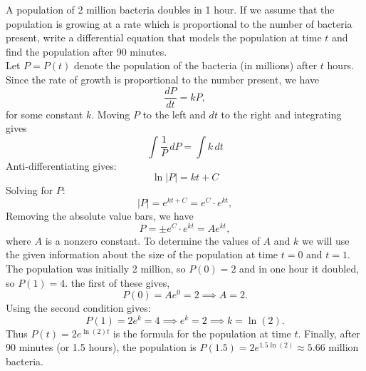 \documentclass[handout]{ximera}
\begin{document}
\begin{example}[example 5]
A population of 2 million bacteria doubles in 1 hour. If we assume that the population is growing at a rate which is proportional to the number of bacteria present,
write a differential equation that models the population at time $t$ and find the population after 90 minutes.\\
Let $P = P(t)$ denote the population of the bacteria (in millions) after $t$ hours.
Since the rate of growth is proportional to the number present, we have
\[
\frac{dP}{dt} = k P,
\]
for some constant $k$.
Moving $P$ to the left and $dt$ to the right and integrating gives
\[
\int \frac{1}{P}\, dP = \int k \, dt
\]
Anti-differentiating gives:
\[
\ln|P| = kt + C
\]
Solving for $P$:
\[
|P| = e^{kt+C} = e^C \cdot e^{kt},
\]
Removing the absolute value bars, we have
\[
P = \pm e^C \cdot e^{kt} = Ae^{kt},
\]
where $A$ is a nonzero constant.
To determine the values of $A$ and $k$ we will use the given information about the size of the population at time $t = 0$ and $t = 1$.
The population was initially 2 million, so $P(0) = 2$ and in one hour it doubled, so $P(1) = 4$. the first of these gives,
\[
P(0) = Ae^{0} = 2 \implies A = 2.
\]
Using the second condition gives:
\[
P(1) = 2e^k = 4 \implies e^k = 2 \implies k = \ln(2).
\]
Thus $P(t) = 2e^{\ln(2)t}$ is the formula for the population at time $t$. Finally, after 90 minutes (or 1.5 hours), the population is 
$P(1.5) = 2e^{1.5\ln(2)} \approx 5.66$ million bacteria.

\end{example}
\end{document}

